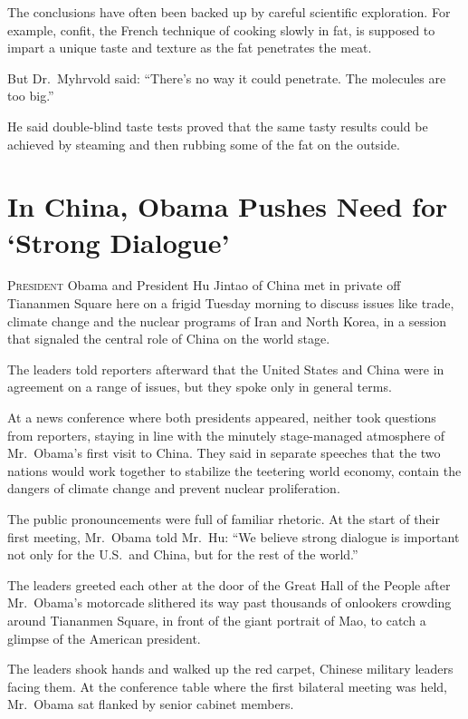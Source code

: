 ﻿\documentclass[12pt]{article}
\begin{document}
The conclusions have often been backed up by careful scientific exploration. For example, confit,
the French technique of cooking slowly in fat, is supposed to impart a unique taste and texture as
the fat penetrates the meat.

But Dr.~Myhrvold said: ``There's no way it could penetrate. The molecules are too big.''

He said double-blind taste tests proved that the same tasty results could be achieved by steaming
and then rubbing some of the fat on the outside.

\section{In China, Obama Pushes Need for `Strong Dialogue'}

\lettrine{P}{resident} Obama and President Hu Jintao of China met in private
off Tiananmen Square here on a frigid Tuesday morning to discuss issues like trade, climate change
and the nuclear programs of Iran and North Korea, in a session that signaled the central role of
China on the world stage.

The leaders told reporters afterward that the United States and China were in agreement on a range
of issues, but they spoke only in general terms.

At a news conference where both presidents appeared, neither took questions from reporters, staying
in line with the minutely stage-managed atmosphere of Mr.~Obama's first visit to China. They said in
separate speeches that the two nations would work together to stabilize the teetering world economy,
contain the dangers of climate change and prevent nuclear proliferation.

The public pronouncements were full of familiar rhetoric. At the start of their first meeting,
Mr.~Obama told Mr.~Hu: ``We believe strong dialogue is important not only for the U.S.~and China,
but for the rest of the world.''

The leaders greeted each other at the door of the Great Hall of the People after Mr.~Obama's
motorcade slithered its way past thousands of onlookers crowding around Tiananmen Square, in front
of the giant portrait of Mao, to catch a glimpse of the American president.

The leaders shook hands and walked up the red carpet, Chinese military leaders facing them. At the
conference table where the first bilateral meeting was held, Mr.~Obama sat flanked by senior cabinet
members.
\end{document}

